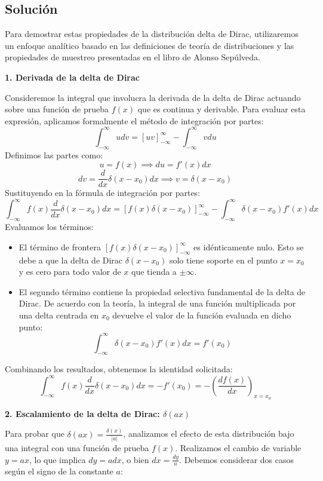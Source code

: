 \documentclass[a4paper]{article}
\begin{document}
\subsection{Solución}

Para demostrar estas propiedades de la distribución delta de Dirac, utilizaremos un enfoque analítico basado en las definiciones de teoría de distribuciones y las propiedades de muestreo presentadas en el libro de Alonso Sepúlveda.

\textbf{1. Derivada de la delta de Dirac}

Consideremos la integral que involucra la derivada de la delta de Dirac actuando sobre una función de prueba $f(x)$ que es continua y derivable. Para evaluar esta expresión, aplicamos formalmente el método de integración por partes:
$$ \int_{-\infty}^{\infty} u dv = [uv]_{-\infty}^{\infty} - \int_{-\infty}^{\infty} v du $$
Definimos las partes como:
$$ u = f(x) \implies du = f'(x)dx $$
$$ dv = \frac{d}{dx} \delta(x-x_0) dx \implies v = \delta(x-x_0) $$
Sustituyendo en la fórmula de integración por partes:
$$ \int_{-\infty}^{\infty} f(x) \frac{d}{dx} \delta(x-x_0) dx = [f(x) \delta(x-x_0)]_{-\infty}^{\infty} - \int_{-\infty}^{\infty} \delta(x-x_0) f'(x) dx $$
Evaluamos los términos:
\begin{itemize}
    \item El término de frontera $[f(x) \delta(x-x_0)]_{-\infty}^{\infty}$ es idénticamente nulo. Esto se debe a que la delta de Dirac $\delta(x-x_0)$ solo tiene soporte en el punto $x = x_0$ y es cero para todo valor de $x$ que tienda a $\pm \infty$.
    \item El segundo término contiene la propiedad selectiva fundamental de la delta de Dirac. De acuerdo con la teoría, la integral de una función multiplicada por una delta centrada en $x_0$ devuelve el valor de la función evaluada en dicho punto:
    $$ \int_{-\infty}^{\infty} \delta(x-x_0) f'(x) dx = f'(x_0) $$
\end{itemize}
Combinando los resultados, obtenemos la identidad solicitada:
$$ \int_{-\infty}^{\infty} f(x) \frac{d}{dx} \delta(x-x_0) dx = - f'(x_0) = - \left( \frac{df(x)}{dx} \right)_{x=x_0} $$

\textbf{2. Escalamiento de la delta de Dirac: $\delta(ax)$}

Para probar que $\delta(ax) = \frac{\delta(x)}{|a|}$, analizamos el efecto de esta distribución bajo una integral con una función de prueba $f(x)$. Realizamos el cambio de variable $y = ax$, lo que implica $dy = a dx$, o bien $dx = \frac{dy}{a}$. Debemos considerar dos casos según el signo de la constante $a$:
\end{document}
